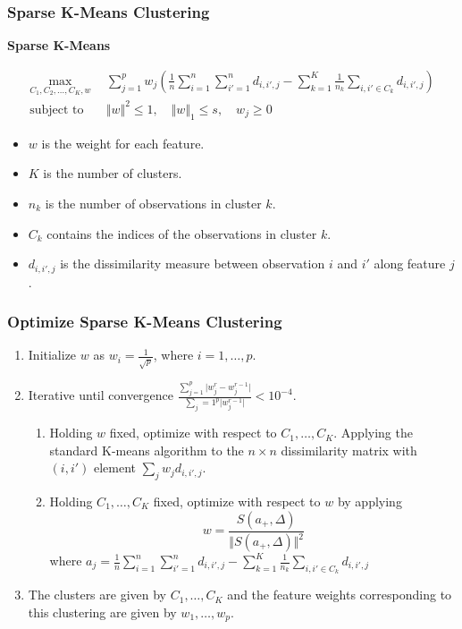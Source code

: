 \documentclass{beamer}
\begin{document}
\begin{frame}
\frametitle{Sparse K-Means Clustering}
{\Large \bf Sparse K-Means}

\begin{eqnarray*}
\max_{C_1,C_2,\ldots,C_K,w} ~&~ \sum_{j=1}^p w_j(\frac{1}{n} \sum_{i=1}^n \sum_{i'=1}^n d_{i,i',j} - \sum_{k=1}^K \frac{1}{n_k} \sum_{i,i' \in C_k} d_{i,i',j} ) \\
\text{subject to } ~&~ \Vert w \Vert^2 \le 1, \quad \Vert w \Vert_1 \le s, \quad w_j \ge 0
\end{eqnarray*}
\begin{itemize}
    \item $w$ is the weight for each feature.
    \item $K$ is the number of clusters.
    \item $n_k$ is the number of observations in cluster $k$.
    \item $C_k$ contains the indices of the observations in cluster $k$.
    \item $d_{i,i',j}$ is the dissimilarity measure between observation $i$ and $i'$ along feature $j$.
\end{itemize}
\end{frame}
\begin{frame}
\frametitle{Optimize Sparse K-Means Clustering}
\begin{enumerate}
\item Initialize $w$ as $w_i = \frac{1}{\sqrt{p}}$, where $i = 1, \ldots, p$.
\item Iterative until convergence $\frac{ \sum_{j=1}^p \vert w_j^r - w_j^{r-1} \vert}{\sum_j=1^p \vert w_j^{r-1} \vert} < 10^{-4}$.
    \begin{enumerate}
    \item Holding $w$ fixed, optimize with respect to $C_1, \ldots, C_K$. Applying the standard K-means algorithm to the $n \times n$ dissimilarity matrix with $(i,i')$ element $\sum_j w_j d_{i,i',j}$.
    \item Holding $C_1,\ldots, C_K$ fixed, optimize with respect to $w$ by applying
$$
w = \frac{S(a_+, \Delta)}{\Vert S(a_+,\Delta) \Vert^2}
$$
where
$
a_j = \frac{1}{n} \sum_{i=1}^n \sum_{i'=1}^n d_{i,i',j} - \sum_{k=1}^K \frac{1}{n_k} \sum_{i,i' \in C_k} d_{i,i',j}
$
    \end{enumerate}
\item The clusters are given by $C_1,\ldots, C_K$ and the feature weights corresponding to this clustering are given by $w_1, \ldots, w_p$.
\end{enumerate}
\end{frame}
\end{document}
